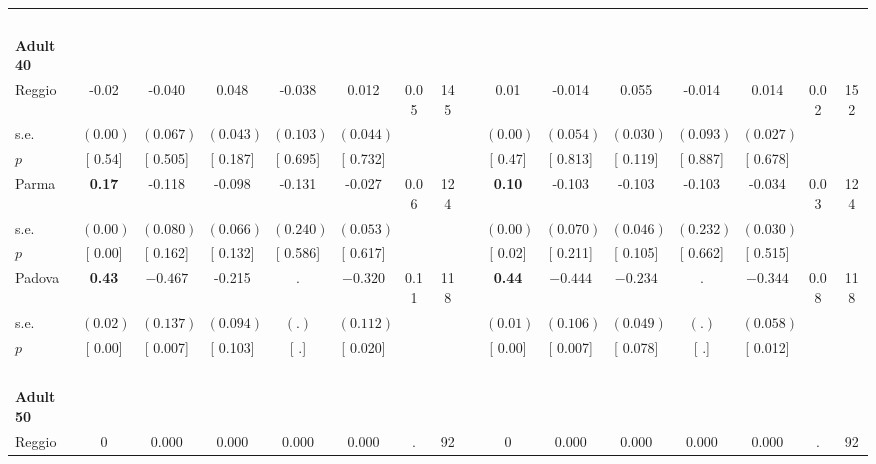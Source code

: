 \begin{longtable}{L{8em} c c c c c c c p{1em} c c c c c c c}
~\\[1em]
\quad \quad \textbf{Adult 40} & & & & & & & & & & & & & & & \\* 
\quad \quad \quad Reggio& -0.02 &    -0.040 &     0.048 &    -0.038 &     0.012 &      0.05 &       145 & & 0.01 &    -0.014 &     0.055 &    -0.014 &     0.014 &      0.02 &       152  \\*
\quad \quad \quad \quad s.e.& $ (     0.00)$ & $ (    0.067)$ & $ (    0.043)$ & $ (    0.103)$ & $ (    0.044)$ & & & & $ (     0.00)$ & $ (    0.054)$ & $ (    0.030)$ & $ (    0.093)$ & $ (    0.027)$ & &  \\*
\quad \quad \quad \quad $ p$ & [     0.54] & [    0.505] & [    0.187] & [    0.695] & [    0.732] & & & & [     0.47] & [    0.813] & [    0.119] & [    0.887] & [    0.678] & &  \\[1em]
\quad \quad \quad Parma& \textbf{     0.17} &    -0.118 &    -0.098 &    -0.131 &    -0.027 &      0.06 &       124 & & \textbf{     0.10} &    -0.103 &    -0.103 &    -0.103 &    -0.034 &      0.03 &       124  \\*
\quad \quad \quad \quad s.e.& $ (     0.00)$ & $ (    0.080)$ & $ (    0.066)$ & $ (    0.240)$ & $ (    0.053)$ & & & & $ (     0.00)$ & $ (    0.070)$ & $ (    0.046)$ & $ (    0.232)$ & $ (    0.030)$ & &  \\*
\quad \quad \quad \quad $ p$ & [     0.00] & [    0.162] & [    0.132] & [    0.586] & [    0.617] & & & & [     0.02] & [    0.211] & [    0.105] & [    0.662] & [    0.515] & &  \\[1em]
\quad \quad \quad Padova& \textbf{     0.43} & $ \mathbf{   -0.467}$ &    -0.215 &         . & $ \mathbf{   -0.320}$ &      0.11 &       118 & & \textbf{     0.44} & $ \mathbf{   -0.444}$ & $ \mathbf{   -0.234}$ &         . & $ \mathbf{   -0.344}$ &      0.08 &       118  \\*
\quad \quad \quad \quad s.e.& $ (     0.02)$ & $ (    0.137)$ & $ (    0.094)$ & $ (        .)$ & $ (    0.112)$ & & & & $ (     0.01)$ & $ (    0.106)$ & $ (    0.049)$ & $ (        .)$ & $ (    0.058)$ & &  \\*
\quad \quad \quad \quad $ p$ & [     0.00] & [    0.007] & [    0.103] & [        .] & [    0.020] & & & & [     0.00] & [    0.007] & [    0.078] & [        .] & [    0.012] & &  \\[1em]
~\\[1em]
\quad \quad \textbf{Adult 50} & & & & & & & & & & & & & & & \\* 
\quad \quad \quad Reggio& 0 &     0.000 &     0.000 &     0.000 &     0.000 &         . &        92 & & 0 &     0.000 &     0.000 &     0.000 &     0.000 &         . &        92  \\*

\end{longtable}
